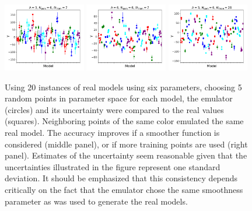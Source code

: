 \documentclass[main.tex]{subfiles}
\begin{document}
\begin{figure}
\includegraphics[width=0.32\textwidth]{sixpars/NPars6_Lambda3_NTrain7}\hspace*{0.02\textwidth}
\includegraphics[width=0.32\textwidth]{sixpars/NPars6_Lambda6_NTrain7}\hspace*{0.02\textwidth}
\includegraphics[width=0.32\textwidth]{sixpars/NPars6_Lambda3_NTrain28}
\caption{\label{fig:sixpars}
Using 20 instances of real models using six parameters, choosing 5 random points in parameter space for each model, the emulator (circles) and its uncertainty were compared to the real values (squares). Neighboring points of the same color emulated the same real model. The accuracy improves if a smoother function is considered (middle panel), or if more training points are used (right panel). Estimates of the uncertainty seem reasonable given that the uncertainties illustrated in the figure represent one standard deviation. It should be emphasized that this consistency depends critically on the fact that the emulator chose the same smoothness parameter as was used to generate the real models.
}
\end{figure}
\end{document}
